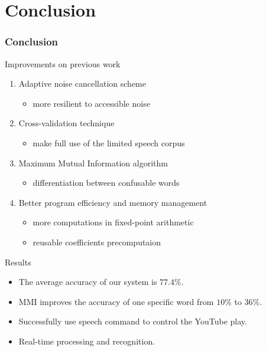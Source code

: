 \section{Conclusion}

\begin{frame}
\frametitle{Conclusion}

Improvements on previous work
\begin{enumerate}
	\item Adaptive noise cancellation scheme
	\begin{itemize}
		\item more resilient to accessible noise
	\end{itemize}
	\item Cross-validation technique
	\begin{itemize}
		\item make full use of the limited speech corpus
	\end{itemize}
	\item Maximum Mutual Information algorithm
	\begin{itemize}
		\item differentiation between confusable words
	\end{itemize}
	\item Better program efficiency and memory management
	\begin{itemize}
		\item more computations in fixed-point arithmetic
		\item reusable coefficients precomputaion
	\end{itemize}
\end{enumerate}
\end{frame}

\begin{frame}
\begin{block}{Results}
\begin{itemize}
	\item The average accuracy of our system is $77.4\%$.
	\item MMI improves the accuracy of one specific word from $10\%$ to $36\%$.
	\item Successfully use speech command to control the YouTube play.
	\item Real-time processing and recognition.
\end{itemize}
\end{block}
\end{frame}
